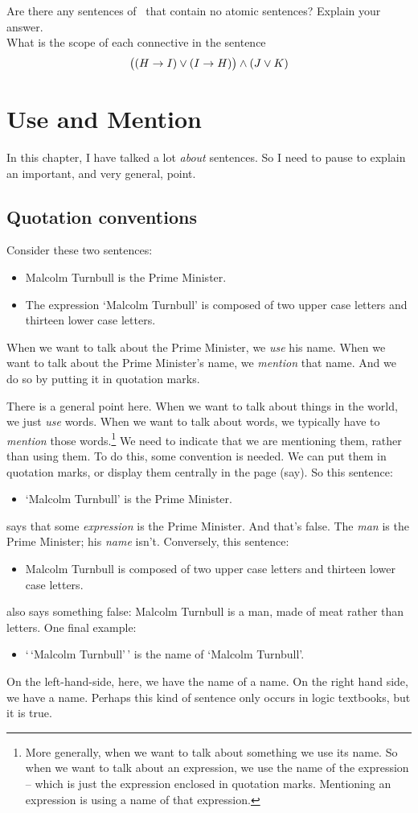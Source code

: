 \problempart
Are there any sentences of \TFL\ that contain no atomic sentences? Explain your answer.\\

\problempart
What is the scope of each connective in the sentence
$$\bigl( (H \rightarrow I) \vee (I \rightarrow H) \bigr) \wedge (J \vee K)$$


\chapter{Use and Mention}\label{s:UseMention}
In this chapter, I have talked a lot \emph{about} sentences. So I need to pause to explain an important, and very general, point.

\section{Quotation conventions}
Consider these two sentences:
	\begin{itemize}
		\item Malcolm Turnbull is the Prime Minister.
		\item The expression `Malcolm Turnbull' is composed of two upper case letters and thirteen lower case letters.
	\end{itemize}
When we want to talk about the Prime Minister, we \emph{use} his name. When we want to talk about the Prime Minister's name, we \emph{mention} that name. And we do so by putting it in quotation marks.

There is a general point here. When we want to talk about things in the world, we just \emph{use} words. When we want to talk about words, we typically have to \emph{mention} those words.\footnote{More generally, when we want to talk about something we use its name. So when we want to talk about an expression, we use the name of the expression – which is just the expression enclosed in quotation marks. Mentioning an expression is using a name of that expression.} We need to indicate that we are mentioning them, rather than using them. To do this, some convention is needed. We can put them in quotation marks, or display them centrally in the page (say). So this sentence:
	\begin{itemize}
		\item `Malcolm Turnbull' is the Prime Minister.
	\end{itemize}
says that some \emph{expression} is the Prime Minister. And that's false. The \emph{man} is the Prime Minister; his \emph{name} isn't. Conversely, this sentence:
	\begin{itemize}
		\item Malcolm Turnbull is composed of two upper case letters and thirteen lower case letters.
	\end{itemize}
also says something false: Malcolm Turnbull is a man, made of meat rather than letters. One final example:
	\begin{itemize}
		\item `\,`Malcolm Turnbull'\,' is the name of `Malcolm Turnbull'.
	\end{itemize} 
On the left-hand-side, here, we have the name of a name. On the right hand side, we have a name. Perhaps this kind of sentence only occurs in logic textbooks, but it is true. 

